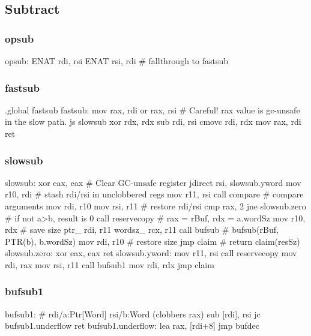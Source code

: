 \subsection{Subtract}

\subsubsection{opsub}

\begin{asm}
opsub:
	ENAT	rdi, rsi
	ENAT	rsi, rdi
	# fallthrough to fastsub
\end{asm}

\subsubsection{fastsub}

\begin{asm}
.global fastsub
fastsub:
	mov	rax, rdi
	or	rax, rsi  # Careful!  rax value is gc-unsafe in the slow path.
	js	slowsub
	xor	rdx, rdx
	sub	rdi, rsi
	cmovc	rdi, rdx
	mov	rax, rdi
	ret
\end{asm}

\subsubsection{slowsub}

\begin{asm}
slowsub:
	xor	eax, eax # Clear GC-unsafe register
	jdirect	rsi, slowsub.yword
	mov	r10, rdi             # stash rdi/rsi in unclobbered regs
	mov	r11, rsi
	call	compare              # compare arguments
	mov	rdi, r10
	mov	rsi, r11             # restore rdi/rsi
	cmp	rax, 2
	jne	slowsub.zero         # if not a>b, result is 0
	call	reservecopy          # rax = rBuf, rdx = a.wordSz
	mov	r10, rdx             # save size
	ptr_	rdi, r11
	wordsz_	rcx, r11
	call	bufsub               # bufsub(rBuf, PTR(b), b.wordSz)
	mov	rdi, r10             # restore size
	jmp	claim                # return claim(resSz)
slowsub.zero:
	xor	eax, eax
	ret
slowsub.yword:
	mov	r11, rsi
	call	reservecopy
	mov	rdi, rax
	mov	rsi, r11
	call	bufsub1
	mov	rdi, rdx
	jmp	claim
\end{asm}

\subsubsection{bufsub1}

\begin{asm}
bufsub1: # rdi/a:Ptr[Word] rsi/b:Word (clobbers rax)
	sub	[rdi], rsi
	jc	bufsub1.underflow
	ret
bufsub1.underflow:
	lea	rax, [rdi+8]
	jmp	bufdec
\end{asm}

